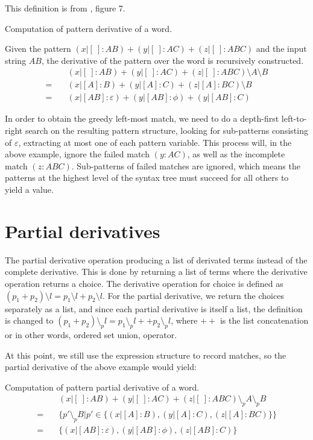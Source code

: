 This definition is from \cite{pdpat}, figure 7.

\begin{eg}
   Computation of pattern derivative of a word.

   Given the pattern $(x|[\:]:AB)+(y|[\:]:AC)+(z|[\:]:ABC)$ and the input string $AB$,
   the derivative of the pattern over the word is recursively constructed.
   \begin{align*}
        &\quad (x|[\:]:AB)+(y|[\:]:AC)+(z|[\:]:ABC) \setminus A \setminus B \\
      = &\quad (x|[A]:B)+(y|[A]:C)+(z|[A]:BC) \setminus B \\
      = &\quad (x|[AB]:\varepsilon)+(y|[AB]:\phi)+(y|[AB]:C)
   \end{align*}
\end{eg}

In order to obtain the greedy left-most match, we need to do a depth-first
left-to-right search on the resulting pattern structure, looking for
sub-patterns consisting of $\varepsilon$, extracting at most one of each pattern
variable. This process will, in the above example, ignore the failed match
$(y:AC)$, as well as the incomplete match $(z:ABC)$. Sub-patterns of failed
matches are ignored, which means the patterns at the highest level of the syntax
tree must succeed for all others to yield a value.


\section{Partial derivatives}

The partial derivative operation producing a list of derivated terms instead of
the complete derivative. This is done by returning a list of terms where the
derivative operation returns a choice. The derivative operation for choice is
defined as $(p_1 + p_2) \setminus l = p_1 \setminus l + p_2 \setminus l$. For
the partial derivative, we return the choices separately as a list, and since
each partial derivative is itself a list, the definition is changed to $(p_1 +
p_2) \setminus_p l = p_1 \setminus_p l ++ p_2 \setminus_p l$, where $++$ is the
list concatenation or in other words, ordered set union, operator.

At this point, we still use the expression structure to record matches, so the
partial derivative of the above example would yield:

\begin{eg}
   Computation of pattern partial derivative of a word.
   \begin{align*}
        &\quad (x|[\:]:AB)+(y|[\:]:AC)+(z|[\:]:ABC) \setminus_p A \setminus_p B \\
      = &\quad \{ p' \setminus_p B | p' \in \{(x|[A]:B), (y|[A]:C), (z|[A]:BC)\} \} \\
      = &\quad \{ (x|[AB]:\varepsilon), (y|[AB]:\phi), (z|[AB]:C) \}
   \end{align*}
\end{eg}

